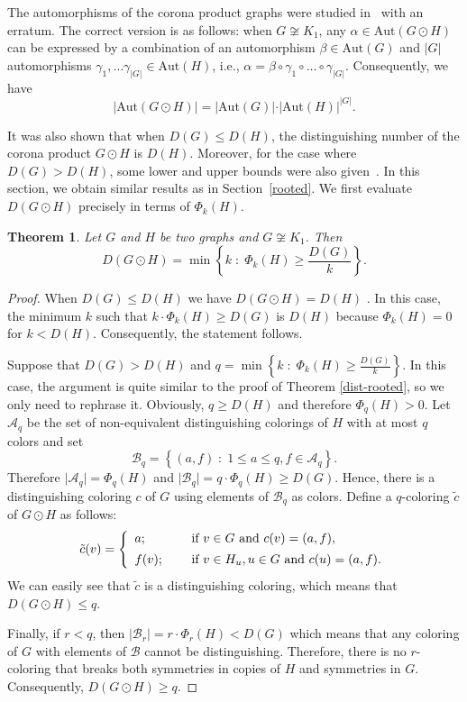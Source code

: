 \documentclass[12pt,a4paper, longbibliography]{article}
\newcommand{\aut}{\mathrm{Aut}}
\newtheorem{theorem}{{\color{THM} Theorem}}[section]
\theoremstyle{definition}
\numberwithin{equation}{section}
\begin{document}
	
	The automorphisms of the corona product graphs were studied in~\cite{Alikhani2017corona} with an erratum. The correct version is as follows: when $G\not\cong K_1$, any $\alpha\in\aut(G\odot H)$ can be expressed by a combination of an automorphism $\beta\in\aut(G)$ and $\vert G\vert$ automorphisms $\gamma_1 ,\ldots \gamma_{\vert G\vert}\in\aut(H)$, i.e., $\alpha=\beta\circ\gamma_1\circ\ldots\circ\gamma_{\vert G\vert}$. Consequently, we have 
\begin{equation}
	\vert \aut(G\odot H)\vert=\vert\aut(G)\vert\cdot\vert\aut(H)\vert^{\vert G\vert}.
\end{equation}
		
	
	It was also shown that when $D(G)\leq D(H)$, the distinguishing number of the corona product $G\odot H$ is $D(H)$. Moreover, for the case where $D(G)>D(H)$, some lower and upper bounds  were also given~\cite{Alikhani2017corona}. In this section,   we obtain similar results as in Section~\ref{rooted}. We first evaluate $D(G\odot H)$ precisely in terms of $\Phi_k (H)$.
	
	\begin{theorem}
		Let $G$ and $H$ be two graphs and $G\not\cong K_1$. Then 
		\[
		D(G\odot H) = \min\left\{k\; : \; \Phi_k (H)\geq\frac{D(G)}{k}\right\}.
		\]
	\end{theorem}
	
	\begin{proof}
	When $D(G)\leq D(H)$ we have $D(G\odot H)=D(H)$ \cite{Alikhani2017corona}. In this case, the minimum $k$ such that $k\cdot \Phi_k (H)\geq D(G)$ is $D(H)$ because $\Phi_k (H)=0$ for $k<D(H)$. Consequently, the statement follows.
		
		Suppose that $D(G)>D(H)$ and $q= \min\left\{k\; :  \; \Phi_k (H)\geq\frac{D(G)}{k}\right\}$. In this case, the argument is quite similar to the proof of Theorem \ref{dist-rooted}, so we only need to rephrase it. Obviously, $q\geq D(H)$ and therefore $\Phi_q (H)>0$. Let $\mathcal{A}_q$ be the set of  non-equivalent distinguishing colorings of $H$ with at most $q$ colors and set 
		\[
		\mathcal{B}_q=\left\{ (a,f)\; : \; 1\leq a\leq q, f\in\mathcal{A}_q \right\}.
		\]
		Therefore  $\vert \mathcal{A}_q \vert = \Phi_q (H)$  and  $\vert \mathcal{B}_q \vert= q\cdot \Phi_q (H) \geq D(G)$. 
		Hence, there is a distinguishing coloring $c$ of $G$ using elements of $\mathcal{B}_q$ as colors. Define a $q$-coloring $\tilde{c}$ of $G\odot H$ as follows:
		\[
		\tilde{c}(v)=\left\{ \begin{array}{lll}
			a; &&\textnormal{ if  } v\in G\textnormal{ and } c (v) = (a,f),\\[5pt]
			f(v); &&\textnormal{ if  } v\in H_u , u\in G \textnormal{ and } c(u)=(a,f).
		\end{array}\right.
		\]
		We can easily see that $\tilde{c}$ is a distinguishing coloring, which means that $D(G\odot H)\leq q$. 
		
		Finally, if $r<q$, then $\vert \mathcal{B}_r \vert =r\cdot \Phi_r (H)<D(G)$ which means that any coloring of $G$ with elements of $\mathcal{B}$ cannot be distinguishing. Therefore, there is no $r$-coloring that breaks both symmetries in copies of $H$ and symmetries in $G$. Consequently, $D(G\odot H)\geq q$.
	\end{proof}
	
\end{document}
